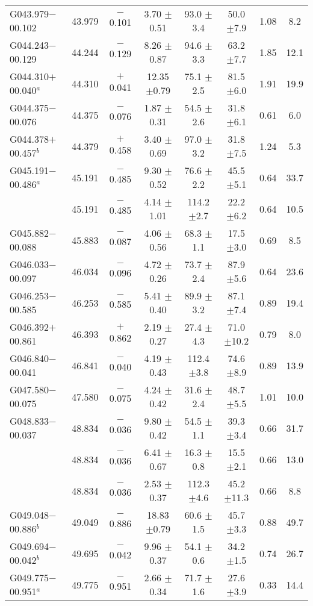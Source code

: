 \begin{ThreePartTable}
\begin{longtable}{lccccccc}
G043.979$-$00.102     &43.979&$-$0.101&3.70	$\pm$0.51&93.0	$\pm$3.4	&50.0	$\pm$7.9	&1.08	&8.2\\
G044.243$-$00.129     &44.244&$-$0.129&8.26	$\pm$0.87&94.6	$\pm$3.3	&63.2	$\pm$7.7	&1.85	&12.1\\
G044.310$+$00.040$^a$ &44.310&$+$0.041&12.35	$\pm$0.79&75.1	$\pm$2.5	&81.5	$\pm$6.0	&1.91	&19.9\\
G044.375$-$00.076     &44.375&$-$0.076&1.87	$\pm$0.31&54.5	$\pm$2.6	&31.8	$\pm$6.1	&0.61	&6.0\\
G044.378$+$00.457$^b$ &44.379&$+$0.458&3.40	$\pm$0.69&97.0	$\pm$3.2	&31.8	$\pm$7.5	&1.24	&5.3\\
G045.191$-$00.486$^a$ &45.191&$-$0.485&9.30	$\pm$0.52&76.6	$\pm$2.2	&45.5	$\pm$5.1	&0.64	&33.7\\
                      &45.191&$-$0.485&4.14	$\pm$1.01&114.2	$\pm$2.7	&22.2	$\pm$6.2	&0.64	&10.5\\
G045.882$-$00.088     &45.883&$-$0.087&4.06	$\pm$0.56&68.3	$\pm$1.1	&17.5	$\pm$3.0	&0.69	&8.5\\
G046.033$-$00.097     &46.034&$-$0.096&4.72	$\pm$0.26&73.7	$\pm$2.4	&87.9	$\pm$5.6	&0.64	&23.6\\
G046.253$-$00.585     &46.253&$-$0.585&5.41	$\pm$0.40&89.9	$\pm$3.2	&87.1	$\pm$7.4	&0.89	&19.4\\
G046.392$+$00.861     &46.393&$+$0.862&2.19	$\pm$0.27&27.4	$\pm$4.3	&71.0	$\pm$10.2	&0.79	&8.0\\
G046.840$-$00.041     &46.841&$-$0.040&4.19	$\pm$0.43&112.4	$\pm$3.8	&74.6	$\pm$8.9	&0.89	&13.9\\
G047.580$-$00.075     &47.580&$-$0.075&4.24	$\pm$0.42&31.6	$\pm$2.4	&48.7	$\pm$5.5	&1.01	&10.0\\
G048.833$-$00.037     &48.834&$-$0.036&9.80	$\pm$0.42&54.5	$\pm$1.1	&39.3	$\pm$3.4	&0.66	&31.7\\
                      &48.834&$-$0.036&6.41	$\pm$0.67&16.3	$\pm$0.8	&15.5	$\pm$2.1	&0.66	&13.0\\
                      &48.834&$-$0.036&2.53	$\pm$0.37&112.3	$\pm$4.6	&45.2	$\pm$11.3	&0.66	&8.8\\
G049.048$-$00.886$^b$ &49.049&$-$0.886&18.83	$\pm$0.79&60.6	$\pm$1.5	&45.7	$\pm$3.3	&0.88	&49.7\\
G049.694$-$00.042$^b$ &49.695&$-$0.042&9.96	$\pm$0.37&54.1	$\pm$0.6	&34.2	$\pm$1.5	&0.74	&26.7\\
G049.775$-$00.951$^a$ &49.775&$-$0.951&2.66	$\pm$0.34&71.7	$\pm$1.6	&27.6	$\pm$3.9	&0.33	&14.4\\

\end{longtable}
\end{ThreePartTable}
